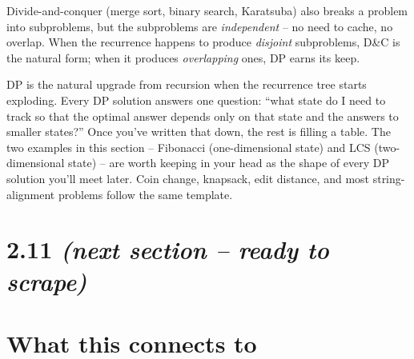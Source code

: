 \documentclass[11pt]{article}
\begin{document}
\begin{notebox}
Divide-and-conquer (merge sort, binary search, Karatsuba) also
breaks a problem into subproblems, but the subproblems are
\emph{independent} -- no need to cache, no overlap. When the
recurrence happens to produce \emph{disjoint} subproblems, D\&C is
the natural form; when it produces \emph{overlapping} ones, DP
earns its keep.
\end{notebox}

\begin{ideabox}
DP is the natural upgrade from recursion when the recurrence tree
starts exploding. Every DP solution answers one question: ``what
state do I need to track so that the optimal answer depends only on
that state and the answers to smaller states?'' Once you've written
that down, the rest is filling a table. The two examples in this
section -- Fibonacci (one-dimensional state) and LCS
(two-dimensional state) -- are worth keeping in your head as the
shape of every DP solution you'll meet later. Coin change,
knapsack, edit distance, and most string-alignment problems follow
the same template.
\end{ideabox}

\section{2.11 \textit{(next section -- ready to scrape)}}

\section*{What this connects to}
\end{document}
